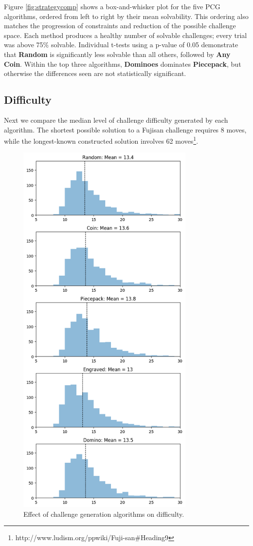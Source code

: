 \documentclass[10pt,journal,compsoc]{IEEEtran}
\begin{document}
Figure \ref{fig:strategycomp} shows a box-and-whisker plot for the five PCG algorithms, ordered from left to right by their mean solvability. This ordering also matches the progression of constraints and reduction of the possible challenge space. Each method produces a healthy number of solvable challenges; every trial was above 75\% solvable. Individual t-tests using a p-value of 0.05 demonstrate that {\bf Random} is significantly less solvable than all others, followed by {\bf Any Coin}. Within the top three algorithms, {\bf Dominoes} dominates {\bf Piecepack}, but otherwise the differences seen are not statistically significant.

\subsection{Difficulty}

Next we compare the median level of challenge difficulty generated by each algorithm. The shortest possible solution to a Fujisan challenge requires 8 moves, while 
the longest-known constructed solution involves 62 moves\footnote{http://www.ludism.org/ppwiki/Fuji-san\#Heading9}.

\begin{figure}[t]
\centering
\includegraphics[width=8.8cm]{graphics/standalonediff.png}
\caption{Effect of challenge generation algorithms on difficulty.}
\label{fig:difficultycomp}
\end{figure}
\end{document}
